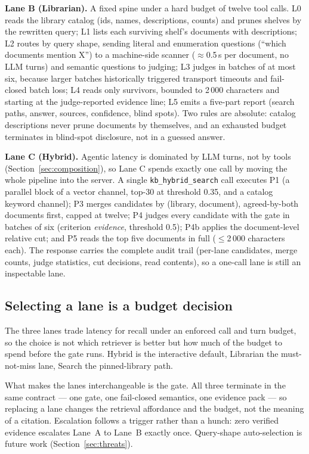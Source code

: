 \textbf{Lane B (Librarian).} A fixed spine under a hard budget of twelve tool
calls. L0 reads the library catalog (ids, names, descriptions, counts) and prunes
shelves by the rewritten query; L1 lists each surviving shelf's documents with
descriptions; L2 routes by query shape, sending literal and enumeration questions
(``which documents mention X'') to a machine-side scanner ($\approx$0.5\,s per
document, no LLM turns) and semantic questions to judging; L3 judges in batches
of at most six, because larger batches historically triggered transport timeouts
and fail-closed batch loss; L4 reads only survivors, bounded to 2\,000 characters
and starting at the judge-reported evidence line; L5 emits a five-part report
(search paths, answer, sources, confidence, blind spots). Two rules are absolute:
catalog descriptions never prune documents by themselves, and an exhausted budget
terminates in blind-spot disclosure, not in a guessed answer.

\textbf{Lane C (Hybrid).} Agentic latency is dominated by LLM turns, not by tools
(Section~\ref{sec:composition}), so Lane C spends exactly one call by moving the
whole pipeline into the server. A single \texttt{kb\_hybrid\_search} call executes
P1 (a parallel block of a vector channel, top-30 at threshold 0.35, and a catalog
keyword channel); P3 merges candidates by (library, document), agreed-by-both
documents first, capped at twelve; P4 judges every candidate with the gate in
batches of six (criterion \emph{evidence}, threshold 0.5); P4b applies the
document-level relative cut; and P5 reads the top five documents in full
($\leq$2\,000 characters each). The response carries the complete audit trail
(per-lane candidates, merge counts, judge statistics, cut decisions, read
contents), so a one-call lane is still an inspectable lane.

\subsection{Selecting a lane is a budget decision}

The three lanes trade latency for recall under an enforced call and turn budget,
so the choice is not which retriever is better but how much of the budget to
spend before the gate runs. Hybrid is the interactive default, Librarian the
must-not-miss lane, Search the pinned-library path.

What makes the lanes interchangeable is the gate. All three terminate in the same
contract --- one gate, one fail-closed semantics, one evidence pack --- so
replacing a lane changes the retrieval affordance and the budget, not the meaning
of a citation. Escalation follows a trigger rather than a hunch: zero verified
evidence escalates Lane~A to Lane~B exactly once. Query-shape auto-selection is
future work (Section~\ref{sec:threats}).

